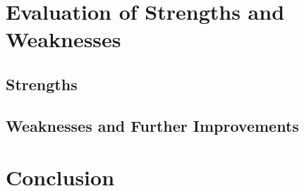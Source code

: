 \documentclass{mcmthesis}
\begin{document}
\section{ Evaluation of Strengths and Weaknesses}%
\subsection{Strengths}
\subsection{Weaknesses and Further Improvements}
\section{Conclusion}

\newpage

\renewcommand{\refname}{References} %
\patchcmd{\thebibliography}{\section*}{\section*}{}{} %
\nocite{*}


\begin{appendices}  %

\end{appendices}  %
\end{document}
